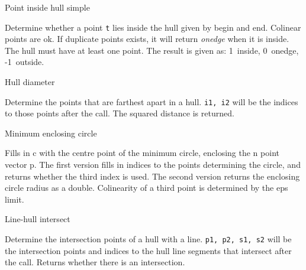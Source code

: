 \begin{algorithm}{Point inside hull simple}

\desc
Determine whether a point {\tt t} lies inside the hull given by
begin and end. Colinear points are ok. If duplicate points exists, it will
return \emph{onedge} when it is inside. The hull must have at least one point.
The result is given as: 1~inside, 0~onedge, -1~outside.
\end{algorithm}

\begin{algorithm}{Hull diameter}

\desc
Determine the points that are farthest apart in a hull.
{\tt i1, i2} will be the indices to those points after the call.
The squared distance is returned.
\end{algorithm}

\begin{algorithm}{Minimum enclosing circle}

\desc
Fills in c with the centre point of the minimum circle, enclosing the
n point vector p. The first version fills in indices to the points
determining the circle, and returns whether the third index is used.
The second version returns the enclosing circle radius as a double.
Colinearity of a third point is determined by the eps limit.
\end{algorithm}

\begin{algorithm}{Line-hull intersect}

\desc
Determine the intersection points of a hull with a line.
{\tt p1, p2, s1, s2} will be the intersection points and indices to the hull
line segments that intersect after the call. Returns whether there is an
intersection.
\end{algorithm}
